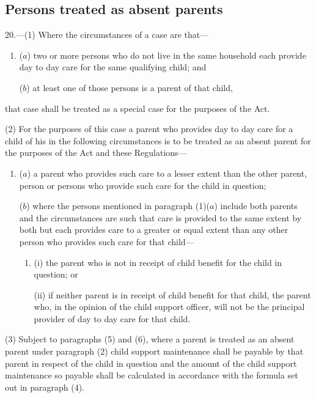 \documentclass[12pt,a4paper]{article}
\begin{document}
\subsection[20. Persons treated as absent parents]{Persons treated as absent parents}

20.—(1) Where the circumstances of a case are that—
\begin{enumerate}\item[]
($a$) two or more persons who do not live in the same household each provide day to day care for the same qualifying child; and

($b$) at least one of those persons is a parent of that child,
\end{enumerate}
that case shall be treated as a special case for the purposes of the Act.

(2) For the purposes of this case a parent who provides day to day care for a child of his in the following circumstances is to be treated as an absent parent for the purposes of the Act and these Regulations—
\begin{enumerate}\item[]
($a$) a parent who provides such care to a lesser extent than the other parent, person or persons who provide such care for the child in question;

($b$) where the persons mentioned in paragraph (1)($a$) include both parents and the circumstances are such that care is provided to the same extent by both but each provides care to a greater or equal extent than any other person who provides such care for that child—
\begin{enumerate}\item[]
(i) the parent who is not in receipt of child benefit for the child in question; or

(ii) if neither parent is in receipt of child benefit for that child, the parent who, in the opinion of the child support officer, will not be the principal provider of day to day care for that child.
\end{enumerate}
\end{enumerate}

(3) Subject to paragraphs (5) and (6), where a parent is treated as an absent parent under paragraph (2) child support maintenance shall be payable by that parent in respect of the child in question and the amount of the child support maintenance so payable shall be calculated in accordance with the formula set out in paragraph (4).
\end{document}

